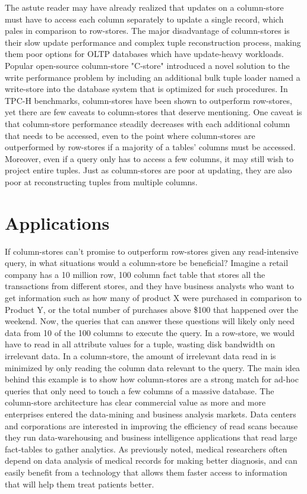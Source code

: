 \documentclass[11pt,a4paper]{report}
\begin{document}
The astute reader may have already realized that updates on a column-store must have to access each column separately to update a single record, which pales in comparison to row-stores. The major disadvantage of column-stores is their slow update performance and complex tuple reconstruction process, making them poor options for OLTP databases which have update-heavy workloads.\cite{boncz2005monetdb} Popular open-source column-store "C-store"\cite{stonebraker2005c} introduced a novel solution to the write performance problem by including an additional bulk tuple loader named a write-store into the database system that is optimized for such procedures. In TPC-H benchmarks, column-stores have been shown to outperform row-stores\cite{stonebraker2005c, abadi2008column}, yet there are few caveats to column-stores that deserve mentioning. One caveat is that column-store performance steadily decreases with each additional column that needs to be accessed, even to the point where column-stores are outperformed by row-stores if a majority of a tables' columns must be accessed. \cite{harizopoulos2006performance} Moreover, even if a query only has to access a few columns, it may still wish to project entire tuples. Just as column-stores are poor at updating, they are also poor at reconstructing tuples from multiple columns.\cite{harizopoulos2006performance}

\section{Applications}
If column-stores can't promise to outperform row-stores given any read-intensive query, in what situations would a column-store be beneficial? Imagine a retail company has a 10 million row, 100 column fact table that stores all the transactions from different stores, and they have business analysts who want to get information such as how many of product X were purchased in comparison to Product Y, or the total number of purchases above \$100 that happened over the weekend. Now, the queries that can answer these questions will likely only need data from 10 of the 100 columns to execute the query. In a row-store, we would have to read in all attribute values for a tuple, wasting disk bandwidth on irrelevant data. In a column-store, the amount of irrelevant data read in is minimized by only reading the column data relevant to the query. The main idea behind this example is to show how column-stores are a strong match for ad-hoc queries that only need to touch a few columns of a massive database. The column-store architecture has clear commercial value as more and more enterprises entered the data-mining and business analysis markets.\cite{holsheimer1994architectural} Data centers and corporations are interested in improving the efficiency of read scans because they run data-warehousing and business intelligence applications that read large fact-tables to gather analytics. \cite{harizopoulos2006performance} As previously noted, medical researchers often depend on data analysis of medical records for making better diagnosis, and can easily benefit from a technology that allows them faster access to information that will help them treat patients better. \cite{weyl1975modular}
\end{document}
